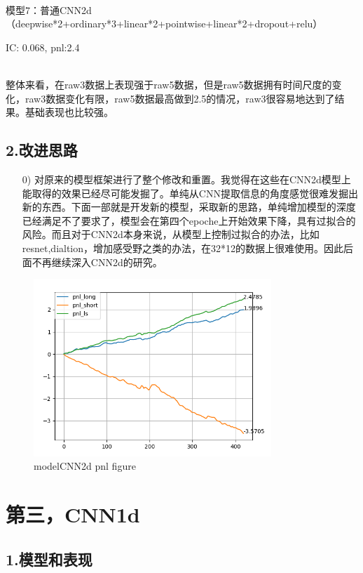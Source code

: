 \documentclass[11pt]{ctexart}
\begin{document}
~\\
模型7：普通CNN2d（deepwise*2+ordinary*3+linear*2+pointwise+linear*2+dropout+relu）

{\kaishu \small IC: 0.068, pnl:2.4}


~\\
整体来看，在raw3数据上表现强于raw5数据，但是raw5数据拥有时间尺度的变化，raw3数据变化有限，raw5数据最高做到2.5的情况，raw3很容易地达到了结果。基础表现也比较强。

\subsection{2.改进思路}
\begin{itemize}
  \item [0)]
  对原来的模型框架进行了整个修改和重置。我觉得在这些在CNN2d模型上能取得的效果已经尽可能发掘了。单纯从CNN提取信息的角度感觉很难发掘出新的东西。下面一部就是开发新的模型，采取新的思路，单纯增加模型的深度已经满足不了要求了，模型会在第四个epoche上开始效果下降，具有过拟合的风险。而且对于CNN2d本身来说，从模型上控制过拟合的办法，比如resnet,dialtion，增加感受野之类的办法，在32*12的数据上很难使用。因此后面不再继续深入CNN2d的研究。
\end{itemize}

\begin{figure}[H]
\begin{center}
\includegraphics[width=0.8\textwidth]{plt1.PNG}
\end{center}
\caption{modelCNN2d pnl figure}
\label{FIG.1}
\end{figure}

\section{第三，CNN1d}
\subsection{1.模型和表现}
\end{document}

